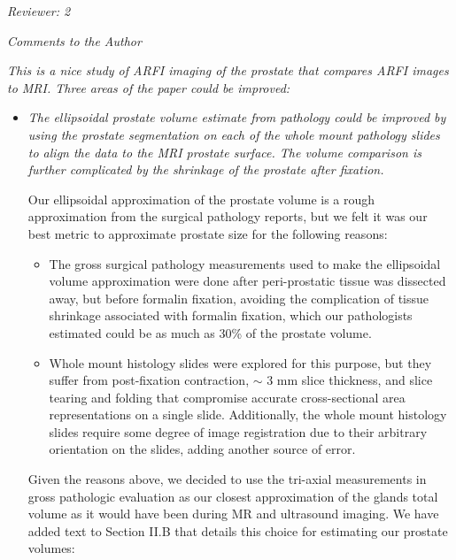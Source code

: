 \documentclass[10pt]{article}
\begin{document}
\textit{Reviewer: 2}

\textit{Comments to the Author}

\textit{This is a nice study of ARFI imaging of the prostate that compares ARFI images
to MRI. Three areas of the paper could be improved:}

\begin{itemize}
    \item \textit{The ellipsoidal prostate volume estimate from pathology could be
        improved by using the prostate segmentation on each of the whole mount
        pathology slides to align the data to the MRI prostate surface. The
        volume comparison is further complicated by the shrinkage of the
        prostate after fixation.}

   Our ellipsoidal approximation of the prostate volume is a rough
   approximation from the surgical pathology reports, but we felt it was our
   best metric to approximate prostate size for the following reasons:

   \begin{itemize}
        \item The gross surgical pathology measurements used to make the
            ellipsoidal volume approximation were done after peri-prostatic
            tissue was dissected away, but before formalin fixation, avoiding
            the complication of tissue shrinkage associated with formalin
            fixation, which our pathologists estimated could be as much as 30\%
            of the prostate volume.
        \item Whole mount histology slides were explored for this purpose, but
            they suffer from post-fixation contraction, $\sim$ 3 mm slice
            thickness, and slice tearing and folding that compromise accurate
            cross-sectional area representations on a single slide.
            Additionally, the whole mount histology slides require some degree
            of image registration due to their arbitrary orientation on the
            slides, adding another source of error.
    \end{itemize}

    Given the reasons above, we decided to use the tri-axial measurements in
    gross pathologic evaluation as our closest approximation of the glands
    total volume as it would have been during MR and ultrasound imaging.  We
    have added text to Section II.B that details this choice for estimating our
    prostate volumes:

    \textbf{}


\end{itemize}
\end{document}
